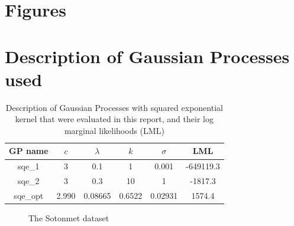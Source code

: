 \documentclass{article}
\begin{document}
\appendix

\section{Figures}\label{appendix:figures}

\section{Description of Gaussian Processes used}\label{appendix:gp_table}


\begin{table}[ht]
\centering
\begin{tabular}{|c|c|c|c|c|c|}
\hline
GP name  & $c$   & $\lambda$ & $k$    & $\sigma$ & LML       \\
\hline
sqe\_1   & 3     & 0.1       & 1      & 0.001    & -649119.3 \\
sqe\_2   & 3     & 0.3       & 10     & 1        & -1817.3   \\
sqe\_opt & 2.990 & 0.08665   & 0.6522 & 0.02931  & 1574.4    \\
\hline
\end{tabular}
\caption{Description of Gaussian Processes with squared exponential kernel that were evaluated in this report, and their log marginal likelihoods (LML)}
\label{table:sqe_table}
\end{table}


\begin{figure}[ht]
    \centering
    \caption{The Sotonmet dataset}
    \label{fig:sotonmet}
\end{figure}
\end{document}
